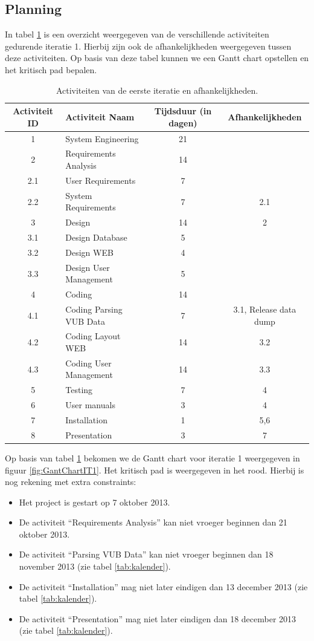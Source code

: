 \subsection{Planning}
In tabel \ref{tab:ActivityDependenciesIteratie1} is een overzicht weergegeven van de verschillende activiteiten gedurende iteratie 1. Hierbij zijn ook de afhankelijkheden weergegeven tussen deze activiteiten. Op basis van deze tabel kunnen we een Gantt chart opstellen en het kritisch pad bepalen.
\begin{table} [H]
	\centering
	\caption{Activiteiten van de eerste iteratie en afhankelijkheden.}
	\begin{tabular} {c|l|c|c}
		Activiteit ID & Activiteit Naam & Tijdsduur (in dagen) & Afhankelijkheden \\
		\hline
		1 & System Engineering & 21 & \\
		2 & Requirements Analysis & 14 & \\
		2.1 & User Requirements & 7 & \\
		2.2 & System Requirements & 7 & 2.1 \\
		3 & Design & 14 & 2 \\
		3.1 & Design Database & 5 & \\
		3.2 & Design WEB & 4 & \\
		3.3 & Design User Management & 5 & \\
		4 & Coding & 14 & \\
		4.1 & Coding Parsing VUB Data & 7 & 3.1, Release data dump \\
		4.2 & Coding Layout WEB & 14 & 3.2 \\
		4.3 & Coding User Management & 14 & 3.3 \\
		5 & Testing & 7 & 4 \\
		6 & User manuals & 3 & 4 \\
		7 & Installation & 1 & 5,6 \\
		8 & Presentation & 3 & 7	
	\end{tabular}
	\label{tab:ActivityDependenciesIteratie1}
\end{table}
Op basis van tabel \ref{tab:ActivityDependenciesIteratie1} bekomen we de Gantt chart voor iteratie 1 weergegeven in figuur \ref{fig:GantChartIT1}. Het kritisch pad is weergegeven in het rood. Hierbij is nog rekening met extra constraints:
\begin{itemize}
	\item Het project is gestart op 7 oktober 2013.
	\item De activiteit ``Requirements Analysis'' kan niet vroeger beginnen dan 21 oktober 2013.
	\item De activiteit ``Parsing VUB Data'' kan niet vroeger beginnen dan 18 november 2013 (zie tabel \ref{tab:kalender}).
	\item De activiteit ``Installation'' mag niet later eindigen dan 13 december 2013 (zie tabel \ref{tab:kalender}).
	\item De activiteit ``Presentation'' mag niet later eindigen dan 18 december 2013 (zie tabel \ref{tab:kalender}).
\end{itemize}
